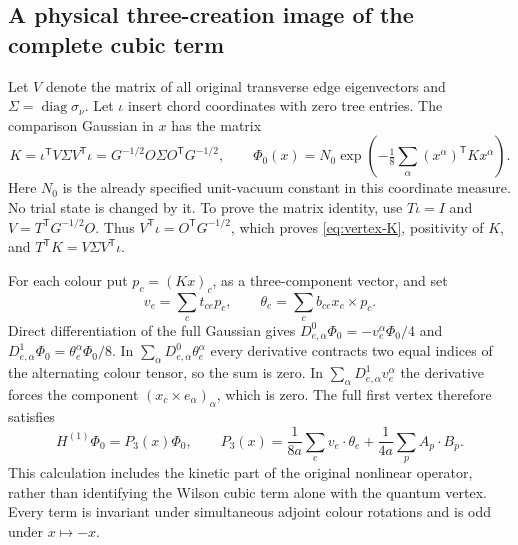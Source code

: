 \subsection{A physical three-creation image of the complete cubic term}

Let $V$ denote the matrix of all original transverse edge eigenvectors
and $\Sigma=\operatorname{diag}\sigma_\nu$. Let $\iota$ insert chord
coordinates with zero tree entries. The comparison Gaussian in $x$
has the matrix
\begin{equation}\label{eq:vertex-K}
 K=\iota^{\mathsf T}V\Sigma V^{\mathsf T}\iota
   =G^{-1/2}O\Sigma O^{\mathsf T}G^{-1/2},\qquad
 \Phi_0(x)=N_0\exp\left(-\tfrac18\sum_\alpha(x^\alpha)^{\mathsf T}Kx^\alpha\right).
\end{equation}
Here $N_0$ is the already specified unit-vacuum constant in this
coordinate measure. No trial state is changed by it. To prove the
matrix identity, use $T\iota=I$ and
$V=T^{\mathsf T}G^{-1/2}O$. Thus
$V^{\mathsf T}\iota=O^{\mathsf T}G^{-1/2}$, which proves
\eqref{eq:vertex-K}, positivity of $K$, and
$T^{\mathsf T}K=V\Sigma V^{\mathsf T}\iota$.

For each colour put $p_c=(Kx)_c$, as a three-component vector,
and set
\[
 v_e=\sum_c t_{ce}p_c,\qquad
 \theta_e=\sum_c b_{ce}x_c\times p_c.
\]
Direct differentiation of the full Gaussian gives
$D^0_{e,\alpha}\Phi_0=-v_e^\alpha\Phi_0/4$ and
$D^1_{e,\alpha}\Phi_0=\theta_e^\alpha\Phi_0/8$.
In $\sum_\alpha D^0_{e,\alpha}\theta_e^\alpha$ every derivative
contracts two equal indices of the alternating colour tensor, so
the sum is zero. In $\sum_\alpha D^1_{e,\alpha}v_e^\alpha$ the
derivative forces the component $(x_c\times e_\alpha)_\alpha$,
which is zero. The full first vertex therefore satisfies
\begin{equation}\label{eq:vertex-cubic-polynomial}
 H^{(1)}\Phi_0=P_3(x)\Phi_0,\qquad
 P_3(x)=\frac1{8a}\sum_e v_e\cdot\theta_e
                      +\frac1{4a}\sum_p A_p\cdot B_p.
\end{equation}
This calculation includes the kinetic part of the original nonlinear
operator, rather than identifying the Wilson cubic term alone with
the quantum vertex. Every term is invariant under simultaneous
adjoint colour rotations and is odd under $x\mapsto-x$.

